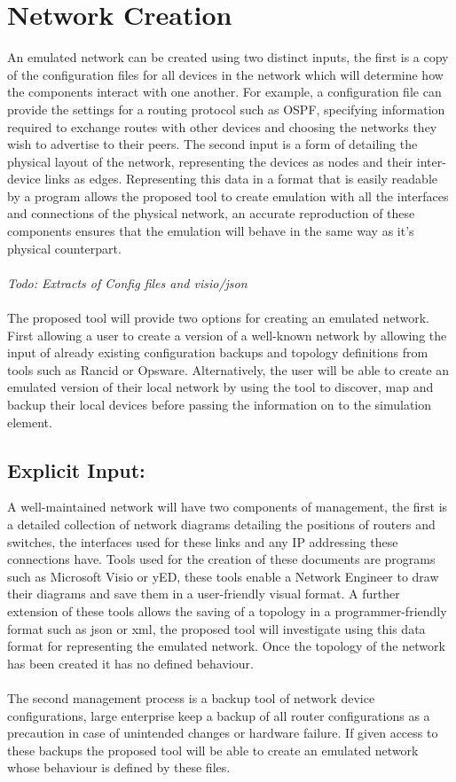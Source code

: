 \documentclass[11pt]{report}
\begin{document}
\section{Network Creation}

An emulated network can be created using two distinct inputs, the first is a copy of the configuration files for all devices in the network which will determine how the components interact with one another. For example, a configuration file can provide the settings for a routing protocol such as OSPF, specifying information required to exchange routes with other devices and choosing the networks they wish to advertise to their peers. The second input is a form of detailing the physical layout of the network, representing the devices as nodes and their inter-device links as edges. Representing this data in a format that is easily readable by a program allows the proposed tool to create emulation with all the interfaces and connections of the physical network, an accurate reproduction of these components ensures that the emulation will behave in the same way as it's physical counterpart.
\\
\\
\textit{Todo: Extracts of Config files and visio/json}
\\
\\
The proposed tool will provide two options for creating an emulated network. First allowing a user to create a version of a well-known network by allowing the input of already existing configuration backups and topology definitions from tools such as Rancid or Opsware. Alternatively, the user will be able to create an emulated version of their local network by using the tool to discover, map and backup their local devices before passing the information on to the simulation element.

\subsection{Explicit Input:}

A well-maintained network will have two components of management, the first is a detailed collection of network diagrams detailing the positions of routers and switches, the interfaces used for these links and any IP addressing these connections have. Tools used for the creation of these documents are programs such as Microsoft Visio or yED, these tools enable a Network Engineer to draw their diagrams and save them in a user-friendly visual format. A further extension of these tools allows the saving of a topology in a programmer-friendly format such as json or xml, the proposed tool will investigate using this data format for representing the emulated network. Once the topology of the network has been created it has no defined behaviour.
\\
\\
The second management process is a backup tool of network device configurations, large enterprise keep a backup of all router configurations as a precaution in case of unintended changes or hardware failure. If given access to these backups the proposed tool will be able to create an emulated network whose behaviour is defined by these files.
\end{document}
